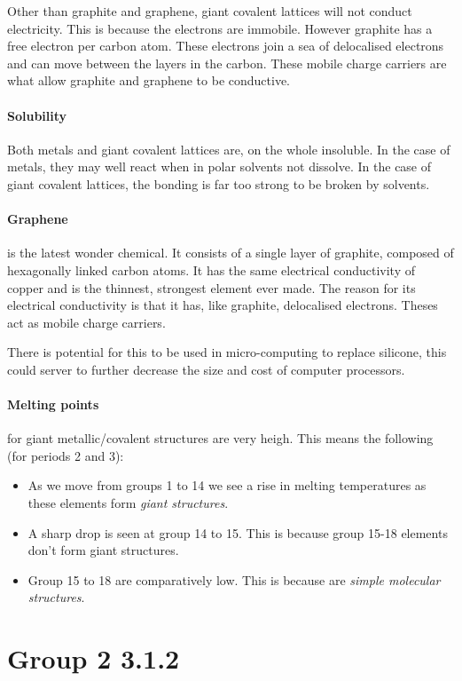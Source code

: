 	Other than graphite and graphene, giant covalent lattices will not conduct electricity. This is because the electrons are immobile. However graphite has a free electron per carbon atom. These electrons join a sea of delocalised electrons and can move between the layers in the carbon. These mobile charge carriers are what allow graphite and graphene to be conductive.
	
	\paragraph{Solubility} Both metals and giant covalent lattices are, on the whole insoluble. In the case of metals, they may well react when in polar solvents not dissolve. In the case of giant covalent lattices, the bonding is far too strong to be broken by solvents.
	
	\paragraph{Graphene} is the latest wonder chemical. It consists of a single layer of graphite, composed of hexagonally linked carbon atoms. It has the same electrical conductivity of copper and is the thinnest, strongest element ever made. The reason for its electrical conductivity is that it has, like graphite, delocalised electrons. Theses act as mobile charge carriers.
	
	There is potential for this to be used in micro-computing to replace silicone, this could server to further decrease the size and cost of computer processors.
	
	\paragraph{Melting points} for giant metallic/covalent structures are very heigh. This means the following (for periods 2 and 3):
	\begin{itemize}
		\item As we move from groups 1 to 14 we see a rise in melting temperatures as these elements form \textit{giant structures}.
		\item A sharp drop is seen at group 14 to 15. This is because group 15-18 elements don't form giant structures.
		\item Group 15 to 18 are comparatively low. This is because are \textit{simple molecular structures}.
	\end{itemize}
\section{Group 2 3.1.2}


